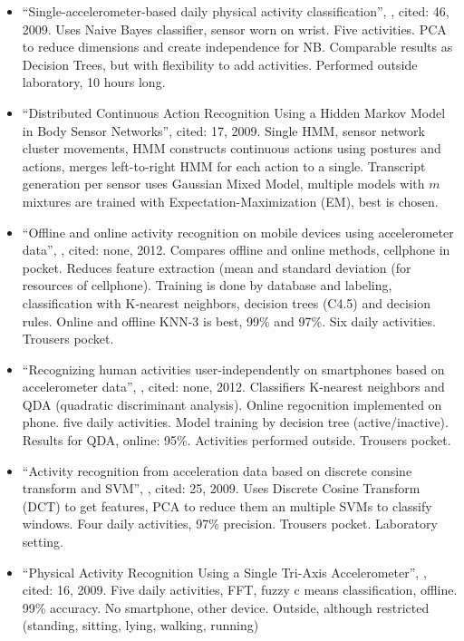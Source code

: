 \begin{itemize}
  \item ``Single-accelerometer-based daily physical activity classification'', \cite{long2009single}, cited: 46, 2009. Uses Naive Bayes classifier, sensor worn on wrist. Five activities. PCA to reduce dimensions and create independence for NB. Comparable results as Decision Trees, but with flexibility to add activities. Performed outside laboratory, 10 hours long.
  \item ``Distributed Continuous Action Recognition Using a Hidden Markov Model in Body Sensor Networks'', \cite{guenterberg2009distributed} cited: 17, 2009. Single HMM, sensor network cluster movements, HMM constructs continuous actions using postures and actions, merges left-to-right HMM for each action to a single. Transcript generation per sensor uses Gaussian Mixed Model, multiple models with $m$ mixtures are trained with Expectation-Maximization (EM), best is chosen.
  \item ``Offline and online activity recognition on mobile devices using accelerometer data'', \cite{duque2012offline}, cited: none, 2012. Compares offline and online methods, cellphone in pocket. Reduces feature extraction (mean and standard deviation (for resources of cellphone). Training is done by database and labeling, classification with K-nearest neighbors, decision trees (C4.5) and decision rules. Online and offline KNN-3 is best, 99\% and 97\%. Six daily activities. Trousers pocket.
  \item ``Recognizing human activities user-independently on smartphones based on accelerometer data'', \cite{siirtola2012recognizing}, cited: none, 2012. Classifiers K-nearest neighbors and QDA (quadratic discriminant analysis). Online regocnition implemented on phone. five daily activities. Model training by decision tree (active/inactive). Results for QDA, online: 95\%. Activities performed outside. Trousers pocket.
  \item ``Activity recognition from acceleration data based on discrete consine transform and SVM'', \cite{he2009activity}, cited: 25, 2009. Uses Discrete Cosine Transform (DCT) to get features, PCA to reduce them an multiple SVMs to classify windows. Four daily activities, 97\% precision. Trousers pocket. Laboratory setting.
  \item ``Physical Activity Recognition Using a Single Tri-Axis Accelerometer'', \cite{lee2178physical}, cited: 16, 2009. Five daily activities, FFT, fuzzy c means classification, offline. 99\% accuracy. No smartphone, other device. Outside, although restricted (standing, sitting, lying, walking, running)
\end{itemize}